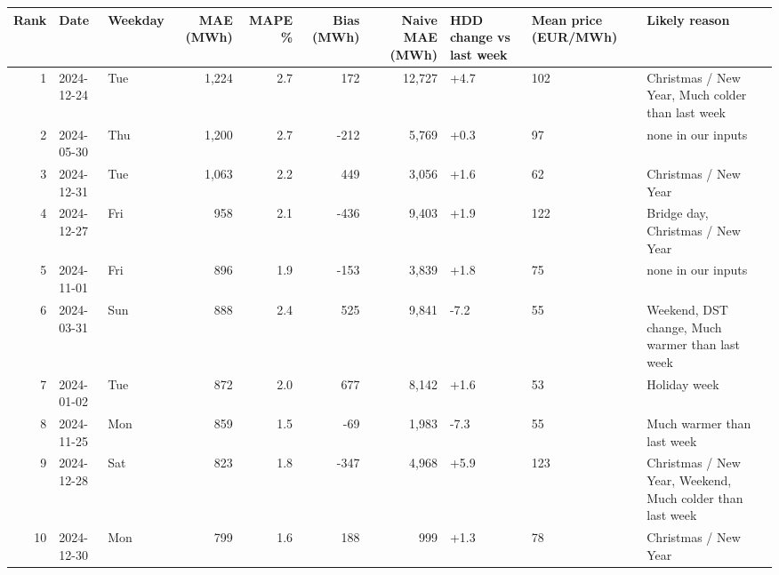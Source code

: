 \begin{tabular}{rllrrrrlll}
\toprule
Rank & Date & Weekday & MAE (MWh) & MAPE \% & Bias (MWh) & Naive MAE (MWh) & HDD change vs last week & Mean price (EUR/MWh) & Likely reason \\
\midrule
1 & 2024-12-24 & Tue & 1,224 & 2.7 & 172 & 12,727 & +4.7 & 102 & Christmas / New Year, Much colder than last week \\
2 & 2024-05-30 & Thu & 1,200 & 2.7 & -212 & 5,769 & +0.3 & 97 & none in our inputs \\
3 & 2024-12-31 & Tue & 1,063 & 2.2 & 449 & 3,056 & +1.6 & 62 & Christmas / New Year \\
4 & 2024-12-27 & Fri & 958 & 2.1 & -436 & 9,403 & +1.9 & 122 & Bridge day, Christmas / New Year \\
5 & 2024-11-01 & Fri & 896 & 1.9 & -153 & 3,839 & +1.8 & 75 & none in our inputs \\
6 & 2024-03-31 & Sun & 888 & 2.4 & 525 & 9,841 & -7.2 & 55 & Weekend, DST change, Much warmer than last week \\
7 & 2024-01-02 & Tue & 872 & 2.0 & 677 & 8,142 & +1.6 & 53 & Holiday week \\
8 & 2024-11-25 & Mon & 859 & 1.5 & -69 & 1,983 & -7.3 & 55 & Much warmer than last week \\
9 & 2024-12-28 & Sat & 823 & 1.8 & -347 & 4,968 & +5.9 & 123 & Christmas / New Year, Weekend, Much colder than last week \\
10 & 2024-12-30 & Mon & 799 & 1.6 & 188 & 999 & +1.3 & 78 & Christmas / New Year \\
\bottomrule
\end{tabular}
